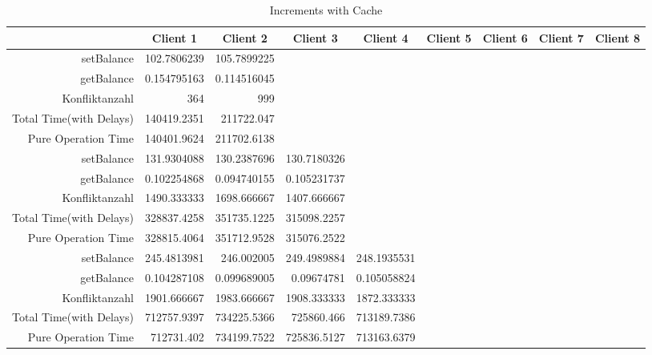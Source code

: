 \begin{landscape}
\begin{table}[htbp]
\scriptsize
  \centering
  \caption{Increments with Cache}
    \begin{tabular}{rrrrrrrrr}
    \toprule
          & \multicolumn{1}{c}{Client 1} & \multicolumn{1}{c}{Client 2} & \multicolumn{1}{c}{Client 3} & \multicolumn{1}{c}{Client 4} & \multicolumn{1}{c}{Client 5} & \multicolumn{1}{c}{Client 6} & \multicolumn{1}{c}{Client 7} & \multicolumn{1}{c}{Client 8} \\
    \midrule
    setBalance & 102.7806239 & 105.7899225 &       &       &       &       &       &  \\
    getBalance & 0.154795163 & 0.114516045 &       &       &       &       &       &  \\
    Konfliktanzahl & 364   & 999   &       &       &       &       &       &  \\
    Total Time(with Delays) & 140419.2351 & 211722.047 &       &       &       &       &       &  \\
    Pure Operation Time & 140401.9624 & 211702.6138 &       &       &       &       &       &  \\
\cline{1-9}     
    setBalance & 131.9304088 & 130.2387696 & 130.7180326 &       &       &       &       &  \\
    getBalance & 0.102254868 & 0.094740155 & 0.105231737 &       &       &       &       &  \\
    Konfliktanzahl & 1490.333333 & 1698.666667 & 1407.666667 &       &       &       &       &  \\
    Total Time(with Delays) & 328837.4258 & 351735.1225 & 315098.2257 &       &       &       &       &  \\
    Pure Operation Time & 328815.4064 & 351712.9528 & 315076.2522 &       &       &       &       &  \\
\cline{1-9}     
    setBalance & 245.4813981 & 246.002005 & 249.4989884 & 248.1935531 &       &       &       &  \\
    getBalance & 0.104287108 & 0.099689005 & 0.09674781 & 0.105058824 &       &       &       &  \\
    Konfliktanzahl & 1901.666667 & 1983.666667 & 1908.333333 & 1872.333333 &       &       &       &  \\
    Total Time(with Delays) & 712757.9397 & 734225.5366 & 725860.466 & 713189.7386 &       &       &       &  \\
    Pure Operation Time & 712731.402 & 734199.7522 & 725836.5127 & 713163.6379 &       &       &       &  \\    

\end{tabular}
\end{table}
\end{landscape}
